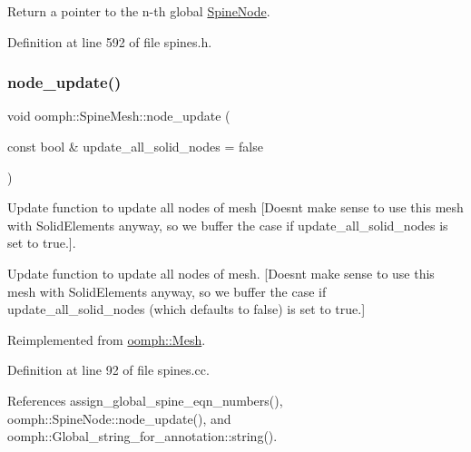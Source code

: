 Return a pointer to the n-\/th global \hyperlink{classoomph_1_1SpineNode}{Spine\+Node}. 



Definition at line 592 of file spines.\+h.

\mbox{\label{classoomph_1_1SpineMesh_ac04a655397d61da66c155f146c698d33}} 
\subsubsection{\texorpdfstring{node\+\_\+update()}{node\_update()}}
{\footnotesize\ttfamily void oomph\+::\+Spine\+Mesh\+::node\+\_\+update (\begin{DoxyParamCaption}\item[{const bool \&}]{update\+\_\+all\+\_\+solid\+\_\+nodes = {\ttfamily false} }\end{DoxyParamCaption})\hspace{0.3cm}{\ttfamily [virtual]}}



Update function to update all nodes of mesh \mbox{[}Doesn\textquotesingle{}t make sense to use this mesh with Solid\+Elements anyway, so we buffer the case if update\+\_\+all\+\_\+solid\+\_\+nodes is set to true.\mbox{]}. 

Update function to update all nodes of mesh. \mbox{[}Doesn\textquotesingle{}t make sense to use this mesh with Solid\+Elements anyway, so we buffer the case if update\+\_\+all\+\_\+solid\+\_\+nodes (which defaults to false) is set to true.\mbox{]} 

Reimplemented from \hyperlink{classoomph_1_1Mesh_a95bf112e5e1b3892e70a41f91b3cc523}{oomph\+::\+Mesh}.



Definition at line 92 of file spines.\+cc.



References assign\+\_\+global\+\_\+spine\+\_\+eqn\+\_\+numbers(), oomph\+::\+Spine\+Node\+::node\+\_\+update(), and oomph\+::\+Global\+\_\+string\+\_\+for\+\_\+annotation\+::string().

\mbox{\label{classoomph_1_1SpineMesh_a8aa10bf71f0d0126e2cdb98a4a4ae264}} 
